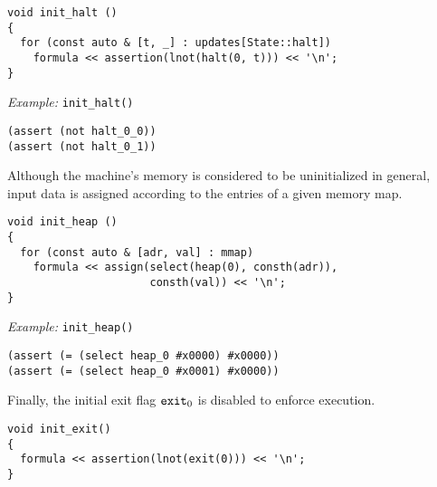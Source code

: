 \begin{lstlisting}[style=c++]
void init_halt ()
{
  for (const auto & [t, _] : updates[State::halt])
    formula << assertion(lnot(halt(0, t))) << '\n';
}
\end{lstlisting}

\noindent
\emph{Example:} \lstinline[style=c++]{init_halt()}

\begin{lstlisting}[language=smtlib]
(assert (not halt_0_0))
(assert (not halt_0_1))
\end{lstlisting}


\noindent
Although the machine's memory is considered to be uninitialized in general, input data is assigned according to the entries of a given memory map.

\begin{lstlisting}[style=c++]
void init_heap ()
{
  for (const auto & [adr, val] : mmap)
    formula << assign(select(heap(0), consth(adr)),
                      consth(val)) << '\n';
}
\end{lstlisting}

\noindent
\emph{Example:} \lstinline[style=c++]{init_heap()}

\begin{lstlisting}[language=smtlib]
(assert (= (select heap_0 #x0000) #x0000))
(assert (= (select heap_0 #x0001) #x0000))
\end{lstlisting}


\noindent
Finally, the initial exit flag $\texttt{exit}_0$ is disabled to enforce execution.

\begin{lstlisting}[style=c++]
void init_exit()
{
  formula << assertion(lnot(exit(0))) << '\n';
}
\end{lstlisting}

